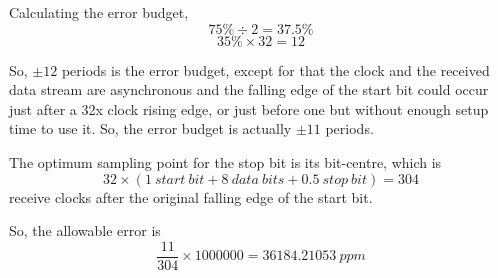 \begin{comment}
\begin{align*}
  \frac{\SI{1500}{bytes} \times \SI{8}{bits/byte}}{\SI{115200}{bits/\second}}&=
  \frac{5}{48}\SI{}{\second}
\end{align*}
\end{comment}


Calculating the error budget,
\[75\% \div 2 = 37.5\%\]
\[35\% \times 32 = 12\]

So, \(\pm 12\) periods is the error budget, except for that the
clock and the received data stream are asynchronous and the falling edge of the
start bit could occur just after a 32x clock rising edge, or just before one but
without enough setup time to use it. So, the error budget is actually \(\pm
11\) periods.

The optimum sampling point for the stop bit is its bit-centre,
which is
\[32 \times (1~start~bit + 8~data~bits + 0.5~stop~bit) = 304 \]
receive clocks after the original falling edge of the start bit.

So, the allowable error is
\[\frac{11}{304} \times 1000000 = 36184.21053~ppm\]
